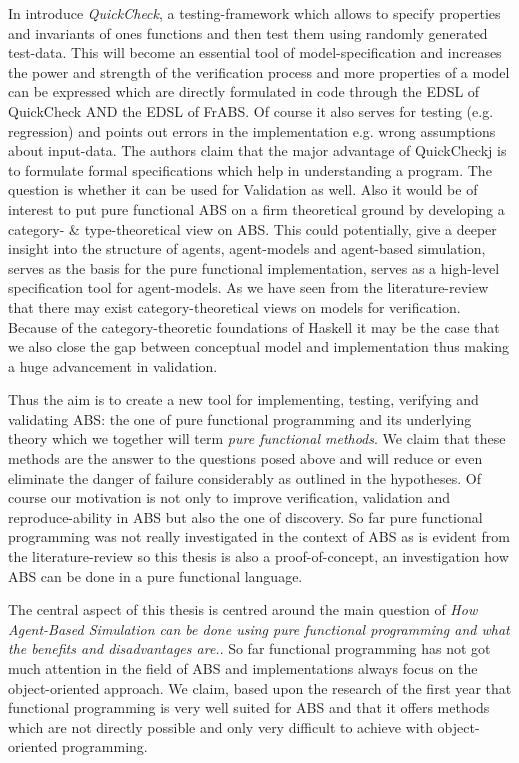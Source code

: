 In \cite{claessen_quickcheck:_2000} introduce \textit{QuickCheck}, a testing-framework which allows to specify properties and invariants of ones functions and then test them using randomly generated test-data. This will become an essential tool of model-specification and increases the power and strength of the verification process and more properties of a model can be expressed which are directly formulated in code through the EDSL of QuickCheck AND the EDSL of FrABS. Of course it also serves for testing (e.g. regression) and points out errors in the implementation e.g. wrong assumptions about input-data. The authors claim that the major advantage of QuickCheckj is to formulate formal specifications which help in understanding a program. The question is whether it can be used for Validation as well.
Also it would be of interest to put pure functional ABS on a firm theoretical ground by developing a category- \& type-theoretical view on ABS. This could potentially, give a deeper insight into the structure of agents, agent-models and agent-based simulation, serves as the basis for the pure functional implementation, serves as a high-level specification tool for agent-models.
As we have seen from the literature-review that there may exist category-theoretical views on models for verification. Because of the category-theoretic foundations of Haskell it may be the case that we also close the gap between conceptual model and implementation thus making a huge advancement in validation.

Thus the aim is to create a new tool for implementing, testing, verifying and validating ABS: the one of pure functional programming and its underlying theory which we together will term \textit{pure functional methods}. We claim that these methods are the answer to the questions posed above and will reduce or even eliminate the danger of failure considerably as outlined in the hypotheses. 
Of course our motivation is not only to improve verification, validation and reproduce-ability in ABS but also the one of discovery. So far pure functional programming was not really investigated in the context of ABS as is evident from the literature-review so this thesis is also a proof-of-concept, an investigation how ABS can be done in a pure functional language.

The central aspect of this thesis is centred around the main question of \textit{How Agent-Based Simulation can be done using pure functional programming and what the benefits and disadvantages are.}. So far functional programming has not got much attention in the field of ABS and implementations always focus on the object-oriented approach. We claim, based upon the research of the first year that functional programming is very well suited for ABS and that it offers methods which are not directly possible and only very difficult to achieve with object-oriented programming. 

